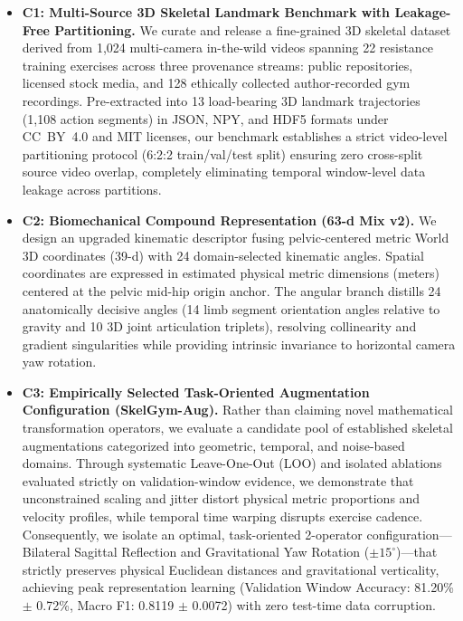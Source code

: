 \documentclass[preprint,12pt]{elsarticle}
\begin{document}
\begin{itemize}
    \item \textbf{C1: Multi-Source 3D Skeletal Landmark Benchmark with Leakage-Free Partitioning.} We curate and release a fine-grained 3D skeletal dataset derived from 1,024 multi-camera in-the-wild videos spanning 22 resistance training exercises across three provenance streams: public repositories, licensed stock media, and 128 ethically collected author-recorded gym recordings. Pre-extracted into 13 load-bearing 3D landmark trajectories (1,108 action segments) in JSON, NPY, and HDF5 formats under CC~BY~4.0 and MIT licenses, our benchmark establishes a strict video-level partitioning protocol (6:2:2 train/val/test split) ensuring zero cross-split source video overlap, completely eliminating temporal window-level data leakage across partitions.
    \item \textbf{C2: Biomechanical Compound Representation (63-d Mix v2).} We design an upgraded kinematic descriptor fusing pelvic-centered metric World 3D coordinates (39-d) with 24 domain-selected kinematic angles. Spatial coordinates are expressed in estimated physical metric dimensions (meters) centered at the pelvic mid-hip origin anchor. The angular branch distills 24 anatomically decisive angles (14 limb segment orientation angles relative to gravity and 10 3D joint articulation triplets), resolving collinearity and gradient singularities while providing intrinsic invariance to horizontal camera yaw rotation.
    \item \textbf{C3: Empirically Selected Task-Oriented Augmentation Configuration (SkelGym-Aug).} Rather than claiming novel mathematical transformation operators, we evaluate a candidate pool of established skeletal augmentations categorized into geometric, temporal, and noise-based domains. Through systematic Leave-One-Out (LOO) and isolated ablations evaluated strictly on validation-window evidence, we demonstrate that unconstrained scaling and jitter distort physical metric proportions and velocity profiles, while temporal time warping disrupts exercise cadence. Consequently, we isolate an optimal, task-oriented 2-operator configuration---Bilateral Sagittal Reflection and Gravitational Yaw Rotation ($\pm 15^\circ$)---that strictly preserves physical Euclidean distances and gravitational verticality, achieving peak representation learning (Validation Window Accuracy: 81.20\% $\pm$ 0.72\%, Macro F1: 0.8119 $\pm$ 0.0072) with zero test-time data corruption.

\end{itemize}
\end{document}
